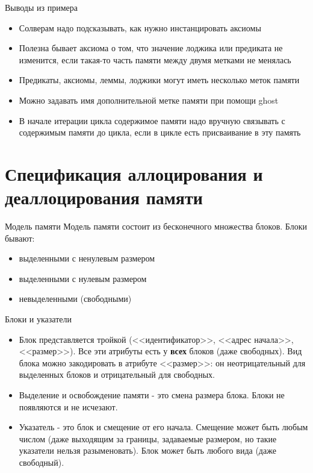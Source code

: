 \documentclass[hyperref={unicode=true}]{beamer}
\begin{document}
    \begin{frame}{Выводы из примера}
    \begin{itemize}
    \item Солверам надо подсказывать, как нужно инстанцировать аксиомы
    \item Полезна бывает аксиома о том, что значение лоджика или предиката не
    изменится, если такая-то часть памяти между двумя метками не менялась
    \item Предикаты, аксиомы, леммы, лоджики могут иметь несколько меток памяти
    \item Можно задавать имя дополнительной метке памяти при помощи ghost
    \item В начале итерации цикла содержимое памяти надо вручную связывать с
    содержимым памяти до цикла, если в цикле есть присваивание в эту память
    \end{itemize}
    \end{frame}

    \section{Спецификация аллоцирования и деаллоцирования памяти}
    \begin{frame}{Модель памяти}
    Модель памяти состоит из бесконечного множества блоков. Блоки бывают:
    \begin{itemize}
    \item выделенными с ненулевым размером
    \item выделенными с нулевым размером
    \item невыделенными (свободными)
    \end{itemize}
    \end{frame}

    \begin{frame}{Блоки и указатели}
    \begin{itemize}
    \item Блок представляется тройкой (<<идентификатор>>, <<адрес начала>>,
    <<размер>>). Все эти атрибуты есть у \textbf{всех} блоков (даже свободных).
    Вид блока можно закодировать в атрибуте <<размер>>: он неотрицательный для
    выделенных блоков и отрицательный для свободных.

    \item Выделение и освобождение памяти - это смена размера блока. Блоки не
    появляются и не исчезают.

    \item Указатель - это блок и смещение от его начала. Смещение может быть любым
    числом (даже выходящим за границы, задаваемые размером, но такие указатели
    нельзя разыменовать). Блок может быть любого вида (даже свободный).
    \end{itemize}
    \end{frame}
\end{document}
